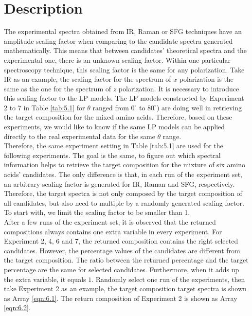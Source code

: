  \label{ch:6}
\section{Description}
The experimental spectra obtained from IR, Raman or SFG techniques have an amplitude scaling factor when comparing to the candidate spectra generated mathematically. This means that between candidates' theoretical spectra and the experimental one, there is an unknown scaling factor. Within one particular spectroscopy technique, this scaling factor is the same for any polarization. Take IR as an example, the scaling factor for the spectrum of $x$ polarization is the same as the one for the spectrum of $z$ polarization. It is necessary to introduce this scaling factor to the LP models. The LP models constructed by Experiment 2 to 7 in Table \ref{tab:5.1} for $\theta$ ranged from $0^{\circ}$ to $80^{\circ}$) are doing well in retrieving the target composition for the mixed amino acids. Therefore, based on these experiments, we would like to know if the same LP models can be applied directly to the real experimental data for the same $\theta$ range.\\

Therefore, the same experiment setting in Table \ref{tab:5.1} are used for the following experiments. The goal is the same, to figure out which spectral information helps to retrieve the target composition for the mixture of six amino acids' candidates. The only difference is that, in each run of the experiment set, an arbitrary scaling factor is generated for IR, Raman and SFG, respectively. Therefore, the target spectra is not only composed by the target composition of all candidates, but also need to multiple by a randomly generated scaling factor. \\

To start with, we limit the scaling factor to be smaller than 1. \\

After a few runs of the experiment set, it is observed that the returned compositions always contains one extra variable in every experiment. For Experiment 2, 4, 6 and 7, the returned composition contains the right selected candidates. However, the percentage values of the candidates are different from the target composition. The ratio between the returned percentage and the target percentage are the same for selected candidates. Furthermore, when it adds up the extra variable, it equals $1$. Randomly select one run of the experiments, then take Experiment 2 as an example, the target composition target spectra is shown as Array \ref{eqn:6.1}. The return composition of Experiment 2 is shown as Array \ref{eqn:6.2}. \\

